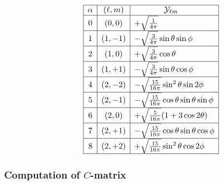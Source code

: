 \documentclass[letterpaper]{article}
\newcommand{\YY}{\mc Y}
\begin{document}
$$\begin{array}{|c|c|l|}\hline
\alpha & (\ell, m) & \hspace{0.5in} \YY_{\ell m}          \\\hline
0      & (   0, 0) & +\sqrt\frac{1}{4\pi} \\\hline
1      & (   1,-1) & -\sqrt{\frac{3}{4\pi}} \sin\theta\sin\phi  \\\hline
2      & (   1, 0) & +\sqrt\frac{3}{4\pi} \cos\theta          \\\hline
3      & (   1,+1) & -\sqrt{\frac{3}{4\pi}} \sin\theta\cos\phi  \\\hline
4      & (   2,-2) & -\sqrt\frac{15}{16\pi} \sin^2\theta \sin 2\phi \\ \hline
5      & (   2,-1) & -\sqrt\frac{15}{16\pi} \cos\theta \sin\theta \sin\phi \\ \hline
6      & (   2, 0) & +\sqrt\frac{5}{16\pi}(1+3\cos 2\theta) \\ \hline
7      & (   2,+1) & -\sqrt\frac{15}{16\pi} \cos\theta \sin\theta \cos\phi \\ \hline
8      & (   2,+2) & +\sqrt\frac{15}{16\pi} \sin^2\theta \cos 2\phi \\ \hline
\end{array}$$
\renewcommand{\arraystretch}{1.0}

\subsubsection*{Computation of $C$-matrix}
\end{document}
